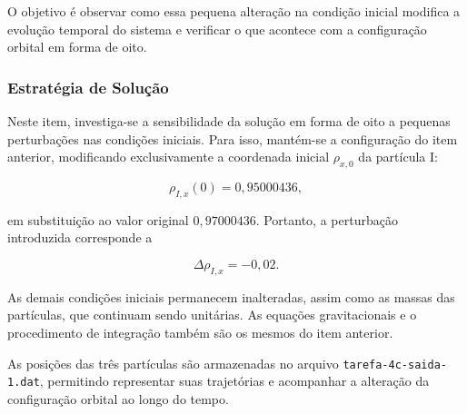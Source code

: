\documentclass[12pt,a4paper]{article}
\begin{document}
O objetivo é observar como essa pequena alteração na condição inicial modifica a evolução temporal do sistema e verificar o que acontece com a configuração orbital em forma de oito.

\subsubsection{Estratégia de Solução}

Neste item, investiga-se a sensibilidade da solução em forma de oito a pequenas perturbações nas condições iniciais. Para isso, mantém-se a configuração do item anterior, modificando exclusivamente a coordenada inicial $\rho_{x,0}$ da partícula I:

\begin{equation}
    \rho_{I,x}(0)=0,95000436,
\end{equation}

em substituição ao valor original $0,97000436$. Portanto, a perturbação introduzida corresponde a

\begin{equation}
    \Delta\rho_{I,x}=-0,02.
\end{equation}

As demais condições iniciais permanecem inalteradas, assim como as massas das partículas, que continuam sendo unitárias. As equações gravitacionais e o procedimento de integração também são os mesmos do item anterior.

As posições das três partículas são armazenadas no arquivo \texttt{tarefa-4c-saida-1.dat}, permitindo representar suas trajetórias e acompanhar a alteração da configuração orbital ao longo do tempo.
\end{document}
